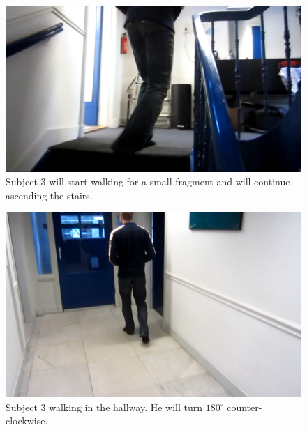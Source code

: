 \begin{figure}
\centering
  \includegraphics[width=1\textwidth]{./Figures/chapter6/data_collection/stills/marc_stairs_up_walk.png}
  \caption[Recording still 9]{Subject 3 will start walking for a small fragment and will continue ascending the stairs.}
  \label{fig:data_gathering_still_3_ascending}
\end{figure}

\begin{figure}
\centering
  \includegraphics[width=1\textwidth]{./Figures/chapter6/data_collection/stills/marc_walk.png}
  \caption[Recording still 10]{Subject 3 walking in the hallway. He will turn $180^{\circ}$ counter-clockwise.}
  \label{fig:data_gathering_still_3_walk}
\end{figure}